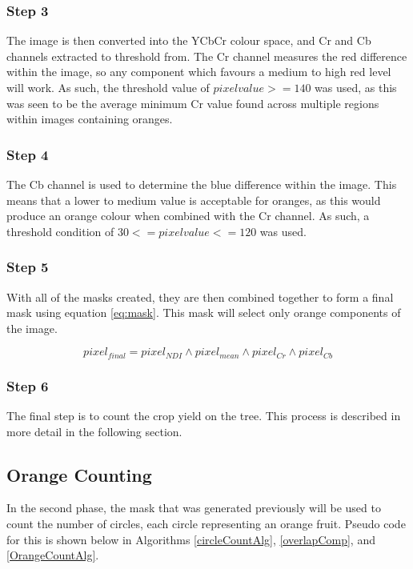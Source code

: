 \documentclass[conference]{IEEEtran}
\begin{document}
\subsubsection{Step 3}
The image is then converted into the YCbCr colour space, and Cr and Cb channels extracted to threshold from. The Cr channel measures the red difference within the image, so any component which favours a medium to high red level will work. As such, the threshold value of $pixelvalue >= 140$ was  used, as this was seen to be the average minimum Cr value found across multiple regions within images containing oranges.

\subsubsection{Step 4}

The Cb channel is used to determine the blue difference within the image. This means that a lower to medium value is acceptable for oranges, as this would produce an orange colour when combined with the Cr channel. As such, a threshold condition of $30 <= pixelvalue <= 120$ was used.

\subsubsection{Step 5}

With all of the masks created, they are then combined together to form a final mask using equation \ref{eq:mask}. This mask will select only orange components of the image.

\begin{equation} \label{eq:mask}
pixel_{final}=pixel_{NDI} \land pixel_{mean} \land pixel_{Cr} \land pixel_{Cb} 
\end{equation}

\subsubsection{Step 6}
The final step is to count the crop yield on the tree.  This process is described in more detail in the following section.


\subsection{Orange Counting} 

In the second phase, the mask that was generated previously will be used to count the number of circles, each circle representing an orange fruit. Pseudo code for this is shown below in Algorithms \ref{circleCountAlg}, \ref{overlapComp}, and \ref{OrangeCountAlg}. 
\end{document}
